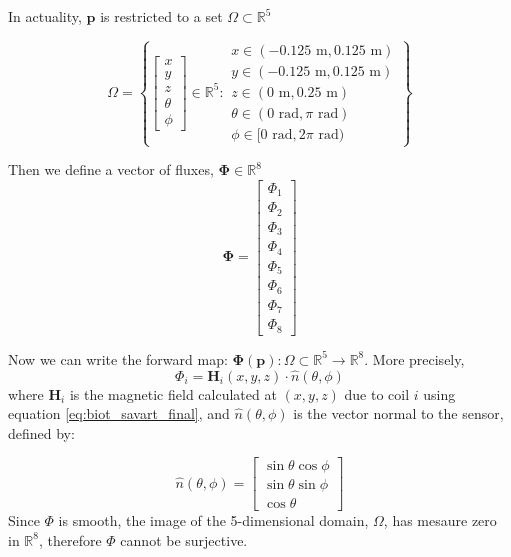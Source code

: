 \documentclass[12pt,a4paper]{report}
\theoremstyle{definition}
\begin{document}
In actuality, $\mathbf{p}$ is restricted to a set $\Omega \subset \mathbb{R}^5$

\begin{equation}
  \Omega = \left\{
  \begin{bmatrix} x \\ y \\ z \\ \theta \\ \phi \end{bmatrix} \in \mathbb{R}^5 : 
  \begin{matrix} x \in (-0.125\text{ m},0.125\text{ m}) \\ y \in (-0.125\text{ m},0.125\text{ m}) \\ z \in (0\text{ m},0.25\text{ m}) \\ \theta \in (0\text{ rad},\pi\text{ rad}) \\ \phi \in [0\text{ rad},2\pi\text{ rad}) \end{matrix}
  \right\}
\end{equation}

Then we define a vector of fluxes, $\mathbf{\Phi} \in \mathbb{R}^8$
\begin{equation}
  \mathbf{\Phi} = 
  \begin{bmatrix}
    \Phi_1 \\ \Phi_2 \\ \Phi_3 \\ \Phi_4 \\ \Phi_5 \\ \Phi_6 \\ \Phi_7 \\ \Phi_8 
  \end{bmatrix}
\end{equation}

Now we can write the forward map: $\mathbf{\Phi}(\mathbf{p}): \Omega \subset \mathbb{R}^5 \rightarrow \mathbb{R}^8$. More precisely,
\begin{equation}
  \Phi_i = \mathbf{H}_i(x,y,z) \cdot \hat{n}(\theta,\phi) 
\end{equation}
where $\mathbf{H}_i$ is the magnetic field calculated at $(x,y,z)$ due to coil $i$ using equation \eqref{eq:biot_savart_final}, and $\hat{n}(\theta,\phi)$ is the vector normal to the sensor, defined by: 

\begin{equation}
  \hat{n}(\theta,\phi) = 
  \begin{bmatrix}
    \sin\theta\cos\phi \\ \sin\theta\sin\phi \\ \cos\theta
  \end{bmatrix}
\end{equation}
Since $\Phi$ is smooth, the image of the 5-dimensional domain, $\Omega$, has mesaure zero in $\mathbb{R}^8$, therefore $\Phi$ cannot be surjective.
\end{document}
